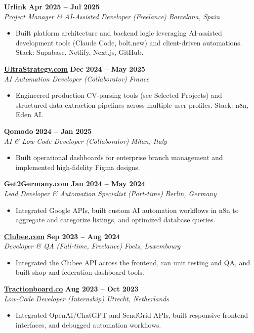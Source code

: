 \documentclass[a4paper,10pt]{article}
\newcommand{\role}[4]{%
 \textbf{#1} \hfill \textbf{#2}\\[1pt]%
 \textit{#3} \hfill \textit{#4}\par\vspace{2pt}%
}
\begin{document}
\role{Urlink}{Apr 2025 -- Jul 2025}{Project Manager \& AI-Assisted Developer (Freelance)}{Barcelona, Spain}
\begin{itemize}
 \item Built platform architecture and backend logic leveraging AI-assisted development tools (Claude Code, bolt.new) and client-driven automations. Stack: Supabase, Netlify, Next.js, GitHub.
\end{itemize}

\role{\href{https://ultrastrategy.com}{UltraStrategy.com}}{Dec 2024 -- May 2025}{AI Automation Developer (Collaborator)}{France}
\begin{itemize}
 \item Engineered production CV-parsing tools (see Selected Projects) and structured data extraction pipelines across multiple user profiles. Stack: n8n, Eden AI.
\end{itemize}

\role{Qomodo}{2024 -- Jan 2025}{AI \& Low-Code Developer (Collaborator)}{Milan, Italy}
\begin{itemize}
 \item Built operational dashboards for enterprise branch management and implemented high-fidelity Figma designs.
\end{itemize}

\role{\href{https://get2germany.com}{Get2Germany.com}}{Jan 2024 -- May 2024}{Lead Developer \& Automation Specialist (Part-time)}{Berlin, Germany}
\begin{itemize}
 \item Integrated Google APIs, built custom AI automation workflows in n8n to aggregate and categorize listings, and optimized database queries.
\end{itemize}

\role{\href{https://clubee.com}{Clubee.com}}{Sep 2023 -- Aug 2024}{Developer \& QA (Full-time, Freelance)}{Foetz, Luxembourg}
\begin{itemize}
 \item Integrated the Clubee API across the frontend, ran unit testing and QA, and built shop and federation-dashboard tools.
\end{itemize}

\role{\href{https://tractionboard.co}{Tractionboard.co}}{Aug 2023 -- Oct 2023}{Low-Code Developer (Internship)}{Utrecht, Netherlands}
\begin{itemize}
 \item Integrated OpenAI/ChatGPT and SendGrid APIs, built responsive frontend interfaces, and debugged automation workflows.
\end{itemize}
\end{document}
